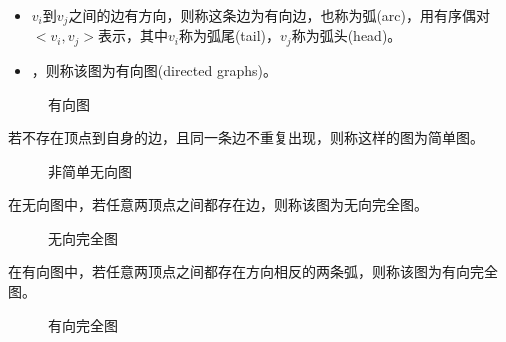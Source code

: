 \begin{frame}\ft{\subsubsecname}
\begin{dingyi}[有向图]
\begin{itemize}
\item 
{}$v_i$到$v_j$之间的边有方向，则称这条边为有向边，也称为弧(arc)，用有序偶对$<v_i,v_j>$表示，其中$v_i$称为弧尾(tail)，$v_j$称为弧头(head)。\\[0.1in]
\item
{}，则称该图为有向图(directed graphs)。
\end{itemize}
\end{dingyi}
\end{frame}


\begin{frame}\ft{\subsubsecname}
\begin{figure}
\centering

\caption{有向图}
\end{figure}
\end{frame}

\begin{frame}\ft{\subsubsecname}
\begin{dingyi}[简单图]
若不存在顶点到自身的边，且同一条边不重复出现，则称这样的图为简单图。
\end{dingyi}


\begin{figure}
\centering

\caption{非简单无向图}
\end{figure}
\end{frame}


\begin{frame}\ft{\subsubsecname}
\begin{dingyi}[无向完全图]
在无向图中，若任意两顶点之间都存在边，则称该图为无向完全图。
\end{dingyi} \vspace{0.1in}


\begin{figure}
\centering

\caption{无向完全图}
\end{figure}

\end{frame}


\begin{frame}\ft{\subsubsecname}
\begin{dingyi}[有向完全图]
在有向图中，若任意两顶点之间都存在方向相反的两条弧，则称该图为有向完全图。
\end{dingyi}\vspace{0.1in}


\begin{figure}
\centering

\caption{有向完全图}
\end{figure}

\end{frame}

